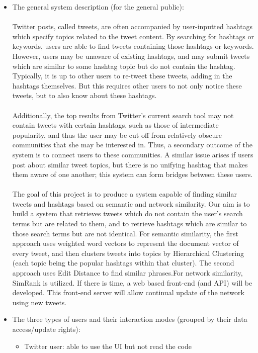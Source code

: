 \documentclass[10pt]{article}
\begin{document}
\begin{itemize} 
\item{The general system description (for the general public): } 
\\\\
Twitter posts, called tweets, are often accompanied by user-inputted hashtags which specify topics related to the tweet content. By searching for hashtags or keywords, users are able to find tweets containing those hashtags or keywords. However, users may be unaware of existing hashtags, and may submit tweets which are similar to some hashtag topic but do not contain the hashtag. Typically, it is up to other users to re-tweet these tweets, adding in the hashtags themselves. But this requires other users to not only notice these tweets, but to also know about these hashtags. 
\\\\
Additionally, the top results from Twitter's current search tool may not contain tweets with certain hashtags, such as those of intermediate popularity, and thus the user may be cut off from relatively obscure communities that she may be interested in. Thus, a secondary outcome of the system is to connect users to these communities. A similar issue arises if users post about similar tweet topics, but there is no unifying hashtag that makes them aware of one another; this system can form bridges between these users. 
\\\\
The goal of this project is to produce a system capable of finding similar tweets and hashtags based on semantic and network similarity. Our aim is to build a system that retrieves tweets which do not contain the user's search terms but are related to them, and to retrieve hashtags which are similar to those search terms but are not identical. For semantic similarity, the first approach uses weighted word vectors to  represent the document vector of every tweet, and then clusters tweets into topics by Hierarchical Clustering (each topic being the popular hashtags within that cluster). The second approach uses Edit Distance to find similar phrases.For network similarity, SimRank is utilized. If there is time, a web based front-end (and API) will be developed. This front-end server will allow continual update of the network using new tweets. 
\\
\item{The three types of users and their interaction modes (grouped by their data access/update rights): }
\begin{itemize} 
\item{Twitter user: able to use the UI but not read the code} 


\end{itemize}
\end{itemize}
\end{document}
